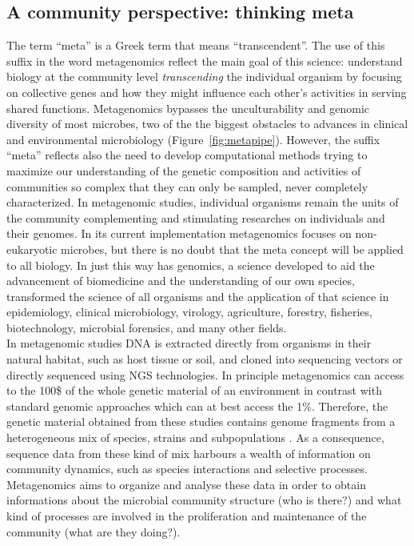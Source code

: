 \subsection{A community perspective: thinking meta}
The term ``meta'' is a Greek term that means ``transcendent''. The use of this suffix in the word metagenomics reflect the main goal of this science: understand biology at the community level \textit{transcending} the individual organism by focusing on collective genes and how they might influence each other’s activities in serving shared functions. Metagenomics bypasses the unculturability and genomic diversity of most microbes, two of the the biggest obstacles to advances in clinical and environmental microbiology (Figure~\ref{fig:metapipe}). However, the suffix ``meta'' reflects also the need to develop computational methods trying to maximize our understanding of the genetic composition and activities of communities so complex that they can only be sampled, never completely characterized. In metagenomic studies, individual organisms remain the units of the community complementing and stimulating researches on individuals and their genomes. In its current implementation metagenomics focuses on non-eukaryotic microbes, but there is no doubt that the meta concept will be applied to all biology. In just this way has genomics, a science developed to aid the advancement of biomedicine and the understanding of our own species, transformed the science of all organisms and the application of that science in epidemiology, clinical microbiology, virology, agriculture, forestry, fisheries, biotechnology, microbial forensics, and many other fields.\\
In metagenomic studies DNA is extracted directly from organisms in their natural habitat, such as host tissue or soil, and cloned into sequencing vectors or directly sequenced using NGS technologies. In principle metagenomics can access to the 100\$ of the whole genetic material of an environment in contrast with standard genomic approaches which can at best access the 1\%. Therefore, the genetic material obtained from these studies contains genome fragments from a heterogeneous mix of species, strains and subpopulations \cite{tringe2005metagenomics}. As a consequence, sequence data from these kind of mix harbours a wealth of information on community dynamics, such as species interactions and selective processes. Metagenomics aims to organize and analyse these data in order to obtain informations about the microbial community structure (who is there?) and what kind of processes are involved in the proliferation and maintenance of the community (what are they doing?).\\
